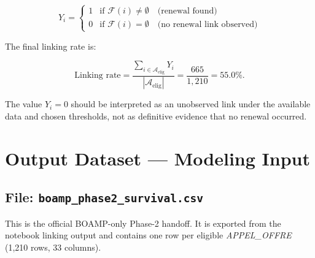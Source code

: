\documentclass[12pt, a4paper]{article}
\begin{document}
\begin{equation}
  Y_i =
	  \begin{cases}
	    1 & \text{if } \mathcal{F}(i) \neq \emptyset \quad \text{(renewal found)} \\
	    0 & \text{if } \mathcal{F}(i) = \emptyset    \quad \text{(no renewal link observed)}
	  \end{cases}
\end{equation}

\noindent The final linking rate is:

\begin{equation}
  \text{Linking rate}
  =
  \frac{\sum_{i \in \mathcal{A}_{\text{elig}}} Y_i}
       {|\mathcal{A}_{\text{elig}}|}
  =
  \frac{665}{1{,}210}
  =
  55.0\%.
\end{equation}

The value $Y_i = 0$ should be interpreted as an unobserved link under the
available data and chosen thresholds, not as definitive evidence that no renewal
occurred.

\section{Output Dataset --- Modeling Input}

\subsection{File: \texttt{boamp\_phase2\_survival.csv}}

This is the official BOAMP-only Phase-2 handoff. It is exported from the
notebook linking output and contains one row per eligible
\textit{APPEL\_OFFRE} (1,210 rows, 33 columns).
\end{document}
